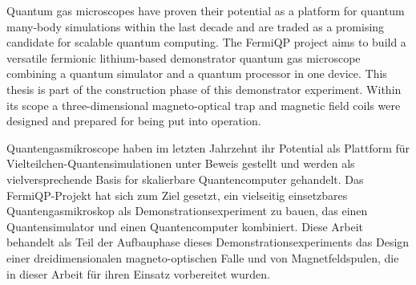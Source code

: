 Quantum gas microscopes have proven their potential as a platform for quantum many-body simulations within the last decade and are traded as a promising candidate for scalable quantum computing. The FermiQP project aims to build a versatile fermionic lithium-based demonstrator quantum gas microscope combining a quantum simulator and a quantum processor in one device. This thesis is part of the construction phase of this demonstrator experiment. Within its scope a three-dimensional magneto-optical trap and magnetic field coils were designed and prepared for being put into operation.

\vspace{2cm}

Quantengasmikroscope haben im letzten Jahrzehnt ihr Potential als Plattform für Vielteilchen-Quantensimulationen unter Beweis gestellt und werden als vielversprechende Basis for skalierbare Quantencomputer gehandelt. Das FermiQP-Projekt hat sich zum Ziel gesetzt, ein vielseitig einsetzbares Quantengasmikroskop als Demonstrationsexperiment zu bauen, das einen Quantensimulator und einen Quantencomputer kombiniert. Diese Arbeit behandelt als Teil der Aufbauphase dieses Demonstrationsexperiments das Design einer dreidimensionalen magneto-optischen Falle und von Magnetfeldspulen, die in dieser Arbeit für ihren Einsatz vorbereitet wurden.